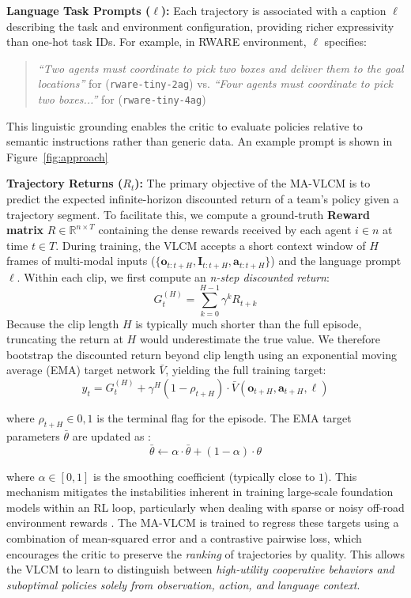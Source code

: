 \documentclass[letterpaper, 10 pt, conference]{ieeeconf}  %
\begin{document}
\textbf{Language Task Prompts ($\ell$):} Each trajectory is associated with a caption $\ell$ describing the task and environment configuration, providing richer expressivity than one-hot task IDs. For example, in RWARE environment, $\ell$ specifies: \begin{quote}
\textit{``Two agents must coordinate to pick two boxes and deliver them to the goal locations''} for (\texttt{rware-tiny-2ag}) vs. \textit{``Four agents must coordinate to pick two boxes...''} for (\texttt{rware-tiny-4ag})
\end{quote}
This linguistic grounding enables the critic to evaluate policies relative to semantic instructions rather than generic data. An example prompt is shown in Figure~\ref{fig:approach}

\textbf{Trajectory Returns ($R_t$):} The primary objective of the MA-VLCM is to predict the expected infinite-horizon discounted return of a team's policy given a trajectory segment. To facilitate this, we compute a ground-truth \textbf{Reward matrix} $R \in \mathbb{R}^{n \times T}$ containing the dense rewards received by each agent $i \in n$ at time $t \in T$. During training, the VLCM accepts a short context window of $H$ frames of multi-modal inputs ($\{\mathbf{o}_{t:t+H}, \mathbf{I}_{t:t+H},\mathbf{a}_{t:t+H}\}$) and the language prompt $\ell$. Within each clip, we first compute an \textit{n-step discounted return}: \begin{equation} G_t^{(H)} = \sum_{k=0}^{H-1} \gamma^k R_{t+k} \end{equation} Because the clip length $H$ is typically much shorter than the full episode, truncating the return at $H$ would underestimate the true value. We therefore bootstrap the discounted return beyond clip length using an exponential moving average (EMA) target network $\bar{V}$, yielding the full training target: 
\begin{equation} 
y_t = G_t^{(H)} + \gamma^{H} (1 - \rho_{t+H}) \cdot \bar{V}(\mathbf{o}_{t+H}, \mathbf{a}_{t+H}, \ell) 
\end{equation}

where $\rho_{t+H} \in {0,1}$ is the terminal flag for the episode. The EMA target parameters $\bar{\theta}$ are updated as :
\begin{equation}
    \bar{\theta} \leftarrow \alpha \cdot \bar{\theta} + (1 - \alpha) \cdot \theta
\end{equation}

where $\alpha \in [0, 1]$ is the smoothing coefficient (typically close to $1$). This mechanism mitigates the instabilities inherent in training large-scale foundation models within an RL loop, particularly when dealing with sparse or noisy off-road environment rewards \cite{zhang2026ema}. The MA-VLCM is trained to regress these targets using a combination of mean-squared error and a contrastive pairwise loss, which encourages the critic to preserve the \textit{ranking} of trajectories by quality. This allows the VLCM to learn to distinguish between \textit{high-utility cooperative behaviors and suboptimal policies solely from observation, action, and language context}.
\end{document}
